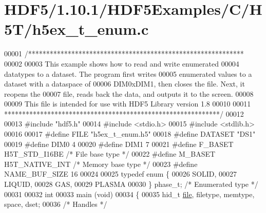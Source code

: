 \hypertarget{_h_d_f5_21_810_81_2_h_d_f5_examples_2_c_2_h5_t_2h5ex__t__enum_8c_source}{}\section{H\+D\+F5/1.10.1/\+H\+D\+F5\+Examples/\+C/\+H5\+T/h5ex\+\_\+t\+\_\+enum.c}
\label{_h_d_f5_21_810_81_2_h_d_f5_examples_2_c_2_h5_t_2h5ex__t__enum_8c_source}

\begin{DoxyCode}
00001 \textcolor{comment}{/************************************************************}
00002 \textcolor{comment}{}
00003 \textcolor{comment}{  This example shows how to read and write enumerated}
00004 \textcolor{comment}{  datatypes to a dataset.  The program first writes}
00005 \textcolor{comment}{  enumerated values to a dataset with a dataspace of}
00006 \textcolor{comment}{  DIM0xDIM1, then closes the file.  Next, it reopens the}
00007 \textcolor{comment}{  file, reads back the data, and outputs it to the screen.}
00008 \textcolor{comment}{}
00009 \textcolor{comment}{  This file is intended for use with HDF5 Library version 1.8}
00010 \textcolor{comment}{}
00011 \textcolor{comment}{ ************************************************************/}
00012 
00013 \textcolor{preprocessor}{#include "hdf5.h"}
00014 \textcolor{preprocessor}{#include <stdio.h>}
00015 \textcolor{preprocessor}{#include <stdlib.h>}
00016 
00017 \textcolor{preprocessor}{#define FILE            "h5ex\_t\_enum.h5"}
00018 \textcolor{preprocessor}{#define DATASET         "DS1"}
00019 \textcolor{preprocessor}{#define DIM0            4}
00020 \textcolor{preprocessor}{#define DIM1            7}
00021 \textcolor{preprocessor}{#define F\_BASET         H5T\_STD\_I16BE       }\textcolor{comment}{/* File base type */}\textcolor{preprocessor}{}
00022 \textcolor{preprocessor}{#define M\_BASET         H5T\_NATIVE\_INT      }\textcolor{comment}{/* Memory base type */}\textcolor{preprocessor}{}
00023 \textcolor{preprocessor}{#define NAME\_BUF\_SIZE   16}
00024 
00025 \textcolor{keyword}{typedef} \textcolor{keyword}{enum} \{
00026     SOLID,
00027     LIQUID,
00028     GAS,
00029     PLASMA
00030 \} phase\_t;                                  \textcolor{comment}{/* Enumerated type */}
00031 
00032 \textcolor{keywordtype}{int}
00033 main (\textcolor{keywordtype}{void})
00034 \{
00035     hid\_t       \hyperlink{structfile}{file}, filetype, memtype, space, dset;
00036                                             \textcolor{comment}{/* Handles */}

\end{DoxyCode}
